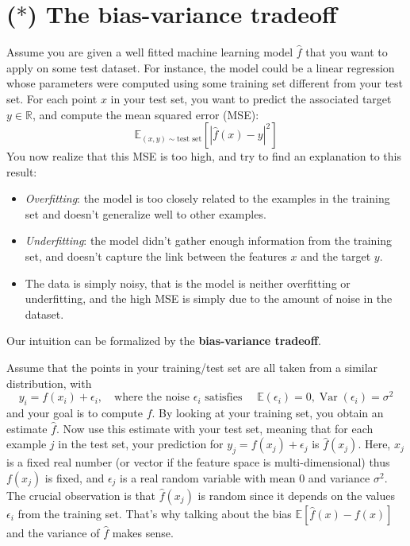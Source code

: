 \vspace{1cm}
\section{($*$) The bias-variance tradeoff}
Assume you are given a well fitted machine learning model $\hat{f}$ that you want to apply on
some test dataset. For instance, the model could be a linear regression whose parameters
were computed using some training set different from your test set. For each point $x$ in your
test set, you want to predict the associated target $y \in \mathbb R$, and compute the mean squared
error (MSE):
\begin{equation}
    \mathbb E_{(x,y)\sim\text{test set}} \left[|\hat{f}(x) - y|^2\right]    
\end{equation}
You now realize that this MSE is too high, and try to find an explanation to this result:
\begin{itemize}
    \item \textit{Overfitting}: the model is too closely related to the examples in the training set and
    doesn't generalize well to other examples.
    \item \textit{Underfitting}: the model didn't gather enough information from the training set, and
    doesn't capture the link between the features $x$ and the target $y$.
    \item The data is simply noisy, that is the model is neither overfitting or underfitting, and
    the high MSE is simply due to the amount of noise in the dataset.
\end{itemize}
Our intuition can be formalized by the \textbf{bias-variance tradeoff}.

Assume that the points in your training/test set are all taken from a similar distribution,
with
\begin{equation}
    y_i = f(x_i) + \epsilon_i, \quad \text{where the noise $\epsilon_i$ satisfies } \quad \mathbb E(\epsilon_i) = 0, \operatorname{Var}(\epsilon_i ) = \sigma^2    
\end{equation}
and your goal is to compute $f$. By looking at your training set, you obtain an estimate $\hat{f}$.
Now use this estimate with your test set, meaning that for each example $j$ in the test set,
your prediction for $y_j = f(x_j) + \epsilon_j$ is $\hat{f}(x_j)$. Here, $x_j$ is a fixed real number (or vector if the
feature space is multi-dimensional) thus $f(x_j)$ is fixed, and $\epsilon_j$ is a real random variable with
mean $0$ and variance $\sigma^2$. The crucial observation is that $\hat{f}(x_j)$ is random since it depends on
the values $\epsilon_i$ from the training set. That's why talking about the bias $\mathbb E[ \hat{f}(x) - f(x)]$ and
the variance of $\hat{f}$ makes sense.

